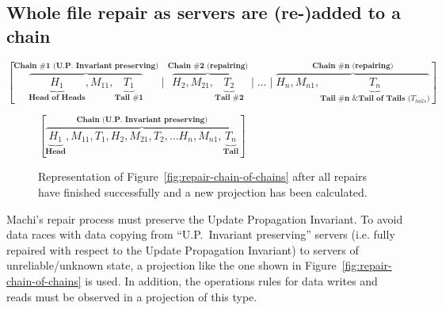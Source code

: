 \documentclass[preprint,10pt]{sigplanconf}
\begin{document}
\subsection{Whole file repair as servers are (re-)added to a chain}
\label{sub:repair-add-to-chain}

\begin{figure*}
\centering
$
[\overbrace{\underbrace{H_1}_\textbf{Head of Heads}, M_{11},
      \underbrace{T_1}_\textbf{Tail \#1}}^\textbf{Chain \#1 (U.P.~Invariant preserving)}
\mid
\overbrace{H_2, M_{21},
      \underbrace{T_2}_\textbf{Tail \#2}}^\textbf{Chain \#2 (repairing)}
\mid \ldots \mid
\overbrace{H_n, M_{n1},
      \underbrace{T_n}_\textbf{Tail \#n \& Tail of Tails ($T_{tails}$)}}^\textbf{Chain \#n (repairing)}
]
$
\caption{Representation of a ``chain of chains'': a chain prefix of
  Update Propagation Invariant preserving FLUs (``Chain \#1'')
  with FLUs from $n-1$ other chains under repair.}
\label{fig:repair-chain-of-chains}
\end{figure*}

\begin{figure}
\centering
$
[\overbrace{\underbrace{H_1}_\textbf{Head}, M_{11}, T_1,
                        H_2, M_{21}, T_2,
                        \ldots
                        H_n, M_{n1},
                        \underbrace{T_n}_\textbf{Tail}}^\textbf{Chain (U.P.~Invariant preserving)}
]
$
\caption{Representation of Figure~\ref{fig:repair-chain-of-chains}
  after all repairs have finished successfully and a new projection has
  been calculated.}
\label{fig:repair-chain-of-chains-finished}
\end{figure}

Machi's repair process must preserve the Update Propagation
Invariant.  To avoid data races with data copying from
``U.P.~Invariant preserving'' servers (i.e. fully repaired with
respect to the Update Propagation Invariant)
to servers of unreliable/unknown state, a
projection like the one shown in
Figure~\ref{fig:repair-chain-of-chains} is used.  In addition, the
operations rules for data writes and reads must be observed in a
projection of this type.
\end{document}
